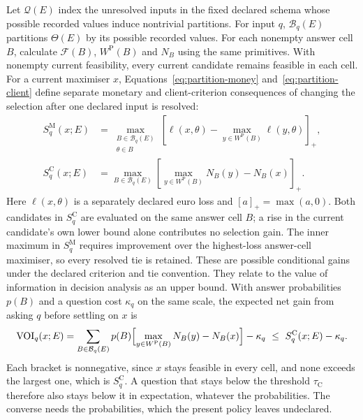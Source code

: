 \documentclass[oneside,10pt,english]{swissi}
\begin{document}
Let $\mathcal Q(E)$ index the unresolved inputs in the fixed declared schema whose possible recorded values induce nontrivial partitions. For input $q$, $\mathcal B_q(E)$ partitions $\Theta(E)$ by its possible recorded values. For each nonempty answer cell $B$, calculate $\mathcal F(B)$, $W^{\mathrm P}(B)$ and $N_B$ using the same primitives. With nonempty current feasibility, every current candidate remains feasible in each cell. For a current maximiser $x$, Equations~\eqref{eq:partition-money} and~\eqref{eq:partition-client} define separate monetary and client-criterion consequences of changing the selection after one declared input is resolved:
\begin{align}
 S_q^{\mathrm M}(x;E)&=\max_{\substack{B\in\mathcal B_q(E)\\\theta\in B}}
 \left[\ell(x,\theta)-\max_{y\in W^{\mathrm P}(B)}\ell(y,\theta)\right]_+,
 \label{eq:partition-money}\\
 S_q^{\mathrm C}(x;E)&=\max_{B\in\mathcal B_q(E)}
 \left[\max_{y\in W^{\mathrm P}(B)}N_B(y)-N_B(x)\right]_+.
 \label{eq:partition-client}
\end{align}
Here $\ell(x,\theta)$ is a separately declared euro loss and $[a]_+=\max(a,0)$. Both candidates in $S_q^{\mathrm C}$ are evaluated on the same answer cell $B$; a rise in the current candidate's own lower bound alone contributes no selection gain. The inner maximum in $S_q^{\mathrm M}$ requires improvement over the highest-loss answer-cell maximiser, so every resolved tie is retained. These are possible conditional gains under the declared criterion and tie convention. They relate to the value of information in decision analysis \parencite{howard1966information} as an upper bound. With answer probabilities $p(B)$ and a question cost $\kappa_q$ on the same scale, the expected net gain from asking $q$ before settling on $x$ is
\begin{equation}
 \mathrm{VOI}_q(x;E)=\sum_{B\in\mathcal B_q(E)}p(B)\Bigl[\max_{y\in W^{\mathrm P}(B)}N_B(y)-N_B(x)\Bigr]-\kappa_q
 \ \le\ S_q^{\mathrm C}(x;E)-\kappa_q.
 \label{eq:voi-bound}
\end{equation}
Each bracket is nonnegative, since $x$ stays feasible in every cell, and none exceeds the largest one, which is $S_q^{\mathrm C}$. A question that stays below the threshold $\tau_{\mathrm C}$ therefore also stays below it in expectation, whatever the probabilities. The converse needs the probabilities, which the present policy leaves undeclared.
\end{document}
